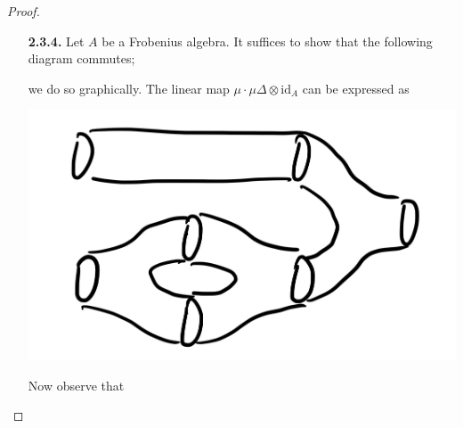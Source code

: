 \documentclass[ 12pt ]{article}
\begin{document}
\begin{enumerate}
		\begin{proof} $ $
			\begin{enumerate}
				\item[\textbf{2.3.4.}] Let $A$ be a Frobenius algebra. It suffices to show that the following diagram commutes;
				\begin{center}
				\end{center}
				we do so graphically. The linear map $\mu \cdot \mu \Delta \otimes \mathrm{id}_A$ can be expressed as
				\begin{center}
				\includegraphics[scale=0.1]{Function}
				\end{center}
				Now observe that
				\begin{center}

\end{center}
\end{enumerate}
\end{proof}
\end{enumerate}
\end{document}
